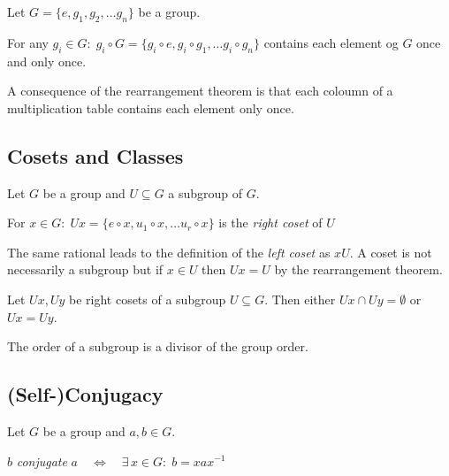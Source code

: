 \begin{thm}\label{thm:11_rearrangement}
Let $G = \lbrace e, g_1, g_2, \dots g_n \rbrace$ be a group. \par
\noindent For any $g_i \in G: \; g_i \circ G = \lbrace g_i \circ e, g_i \circ g_1, \dots g_i \circ g_n \rbrace$ contains each element og $G$ once and only once.
\end{thm}

A consequence of the rearrangement theorem is that each coloumn of a multiplication table contains each element only once.

\subsection{Cosets and Classes}

\begin{dfn}[Coset]\label{dfn:14_coset}
Let $G$ be a group and $U \subseteq G$ a subgroup of $G$. \par
\noindent For $x \in G: \; Ux = \lbrace e\circ x, u_1\circ x, \dots u_r \circ x \rbrace$ is the \textit{right coset} of $U$
\end{dfn}

The same rational leads to the definition of the \textit{left coset} as $xU$. A coset is not necessarily a subgroup but if $x \in U$ then $Ux = U$ by the rearrangement theorem. 

\begin{thm}\label{thm:12_cosets-dist}
Let $Ux, Uy$ be right cosets of a subgroup $U \subseteq G$. Then either $Ux \cap Uy = \emptyset$ or $Ux = Uy$. 
\end{thm}

\begin{thm}\label{thm:13_order-div}
The order of a subgroup is a divisor of the group order. 
\end{thm}

\subsection{(Self-)Conjugacy}

\begin{dfn}[Conjugate]\label{dfn:15_conjugate}
Let $G$ be a group and $a,b \in G$. \par 
\noindent $b$ \textit{conjugate} $a \quad \Leftrightarrow \quad \exists \, x \in G: \; b = xax^{-1}$ 
\end{dfn}

